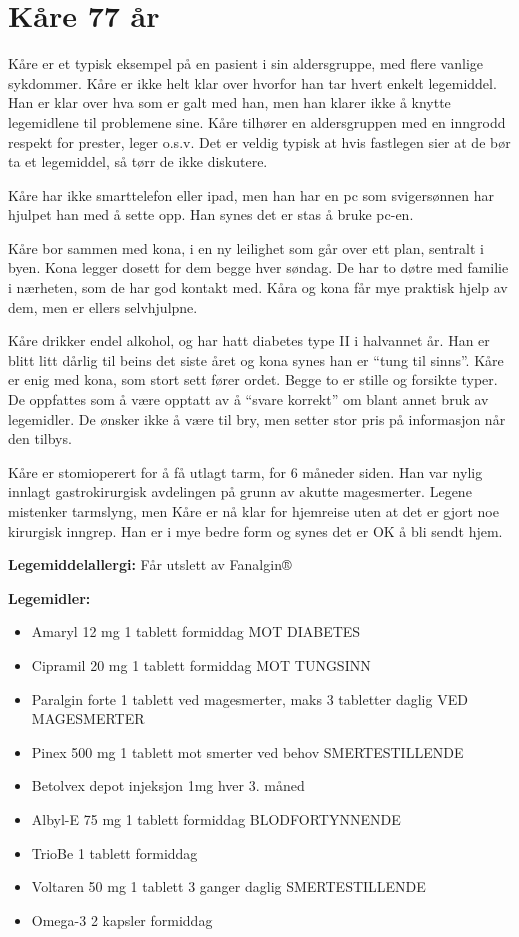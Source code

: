 \chapter{Kåre 77 år} \label{chap:kaare}
Kåre er et typisk eksempel på en pasient i sin aldersgruppe, med flere vanlige sykdommer. Kåre er ikke helt klar over hvorfor han tar hvert enkelt legemiddel. Han er klar over hva som er galt med han, men han klarer ikke å knytte legemidlene til problemene sine. Kåre tilhører en aldersgruppen med en inngrodd respekt for prester, leger o.s.v. Det er veldig typisk at hvis fastlegen sier at de bør ta et legemiddel, så tørr de ikke diskutere.

Kåre har ikke smarttelefon eller ipad, men han har en pc som svigersønnen har hjulpet han med å sette opp. Han synes det er stas å bruke pc-en.

Kåre bor sammen med kona, i en ny leilighet som går over ett plan, sentralt i byen. Kona legger dosett for dem begge hver søndag. De har to døtre med familie i nærheten, som de har god kontakt med. Kåra og kona får mye praktisk hjelp av dem, men er ellers selvhjulpne.

Kåre drikker endel alkohol, og har hatt diabetes type II i halvannet år. Han er blitt litt dårlig til beins det siste året og kona synes han er ``tung til sinns''. Kåre er enig med kona, som stort sett fører ordet. Begge to er stille og forsikte typer. De oppfattes som å være opptatt av å ``svare korrekt'' om blant annet bruk av legemidler. De ønsker ikke å være til bry, men setter stor pris på informasjon når den tilbys.

Kåre er stomioperert for å få utlagt tarm, for 6 måneder siden. Han var nylig innlagt gastrokirurgisk avdelingen på grunn av akutte magesmerter. Legene mistenker tarmslyng, men Kåre er nå klar for hjemreise uten at det er gjort noe kirurgisk inngrep. Han er i mye bedre form og synes det er OK å bli sendt hjem.

\textbf{Legemiddelallergi:} Får utslett av Fanalgin®

\textbf{Legemidler:}
\begin{itemize}
\item Amaryl 12 mg 1 tablett formiddag MOT DIABETES
\item Cipramil 20 mg 1 tablett formiddag MOT TUNGSINN
\item Paralgin forte 1 tablett ved magesmerter, maks 3 tabletter daglig VED MAGESMERTER
\item Pinex 500 mg 1 tablett mot smerter ved behov SMERTESTILLENDE
\item Betolvex depot injeksjon 1mg hver 3. måned
\item Albyl-E 75 mg 1 tablett formiddag BLODFORTYNNENDE
\item TrioBe 1 tablett formiddag 
\item Voltaren 50 mg 1 tablett 3 ganger daglig SMERTESTILLENDE
\item Omega-3 2 kapsler formiddag
\end{itemize}

